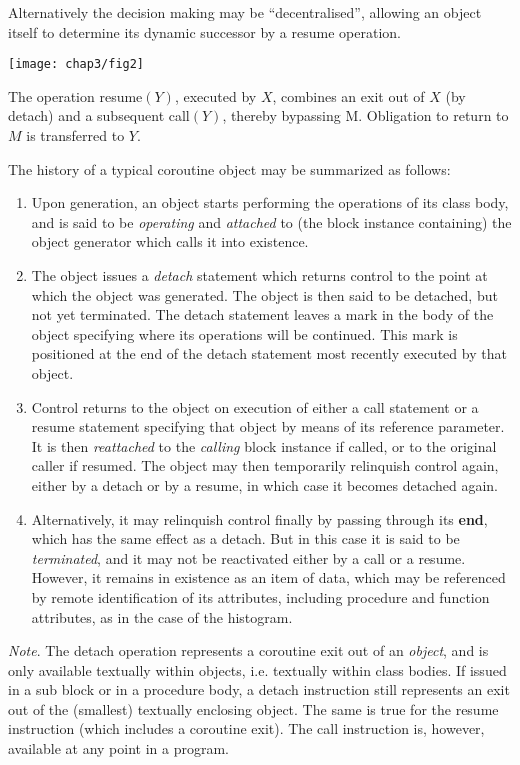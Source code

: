 \noindent
Alternatively the decision making may be ``decentralised'', allowing an object itself to determine its dynamic successor by a resume operation.

\begin{center}
	\texttt{[image: chap3/fig2]}
\end{center}

The operation resume$(Y)$, executed by $X$, combines an exit out of $X$ (by detach) and a subsequent call$(Y)$, thereby bypassing M. Obligation to 	return to $M$ is transferred to $Y$.

The history of a typical coroutine object may be summarized as follows:

\begin{enumerate}[wide, nosep, label=(\arabic*)]
	\item Upon generation, an object starts performing the operations of its class body, and is said to be \textit{operating} and \textit{attached} to (the block instance containing) the object generator which calls it into existence.
	\item The object issues a \textit{detach} statement which returns control to the point at which the object was generated. The object is then said to be detached, but not yet terminated. The detach statement leaves a mark in the body of the object specifying where its operations will be continued. This mark is positioned at the end of the detach statement most recently executed by that object.
	\item Control returns to the object on execution of either a call statement or a resume statement specifying that object by means of its reference parameter. It is then \textit{reattached} to the \textit{calling} block instance if called, or to the original caller if resumed. The object may then temporarily relinquish control again, either by a detach or by a resume, in which case it becomes detached again. 
	\item Alternatively, it may relinquish control finally by passing through its \textbf{end}, which has the same effect as a detach. But in this case it is said to be \textit{terminated}, and it may not be reactivated either by a call or a resume. However, it remains in existence as an item of data, which may be referenced by remote identification of its attributes, including procedure and function attributes, as in the case of the histogram.
\end{enumerate}

\textit{Note}. The detach operation represents a coroutine exit out of an \textit{object}, and is only available textually within objects, i.e. textually within class bodies. If issued in a sub block or in a procedure body, a detach instruction still represents an exit out of the (smallest) textually enclosing object. The same
is true for the resume instruction (which includes a coroutine exit). The call instruction is, however, available at any point in a program.

